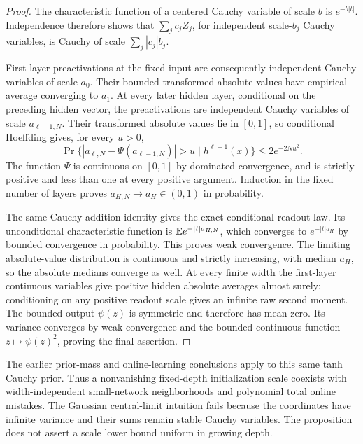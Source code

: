 \begin{proof}
The characteristic function of a centered Cauchy variable of scale $b$ is $e^{-b|t|}$. Independence therefore shows that $\sum_j c_jZ_j$, for independent scale-$b_j$ Cauchy variables, is Cauchy of scale $\sum_j|c_j|b_j$.

First-layer preactivations at the fixed input are consequently independent Cauchy variables of scale $a_0$. Their bounded transformed absolute values have empirical average converging to $a_1$. At every later hidden layer, conditional on the preceding hidden vector, the preactivations are independent Cauchy variables of scale $a_{\ell-1,N}$. Their transformed absolute values lie in $[0,1]$, so conditional Hoeffding gives, for every $u>0$,
\[
 \Pr\{|a_{\ell,N}-\Psi(a_{\ell-1,N})|>u
                 \mid h^{\ell-1}(x)\}\le2e^{-2Nu^2}.
\]
The function $\Psi$ is continuous on $[0,1]$ by dominated convergence, and is strictly positive and less than one at every positive argument. Induction in the fixed number of layers proves $a_{H,N}\to a_H\in(0,1)$ in probability.

The same Cauchy addition identity gives the exact conditional readout law. Its unconditional characteristic function is $\mathbb E e^{-|t|a_{H,N}}$, which converges to $e^{-|t|a_H}$ by bounded convergence in probability. This proves weak convergence. The limiting absolute-value distribution is continuous and strictly increasing, with median $a_H$, so the absolute medians converge as well. At every finite width the first-layer continuous variables give positive hidden absolute averages almost surely; conditioning on any positive readout scale gives an infinite raw second moment. The bounded output $\psi(z)$ is symmetric and therefore has mean zero. Its variance converges by weak convergence and the bounded continuous function $z\mapsto\psi(z)^2$, proving the final assertion.
\end{proof}

The earlier prior-mass and online-learning conclusions apply to this same tanh Cauchy prior. Thus a nonvanishing fixed-depth initialization scale coexists with width-independent small-network neighborhoods and polynomial total online mistakes. The Gaussian central-limit intuition fails because the coordinates have infinite variance and their sums remain stable Cauchy variables. The proposition does not assert a scale lower bound uniform in growing depth.
